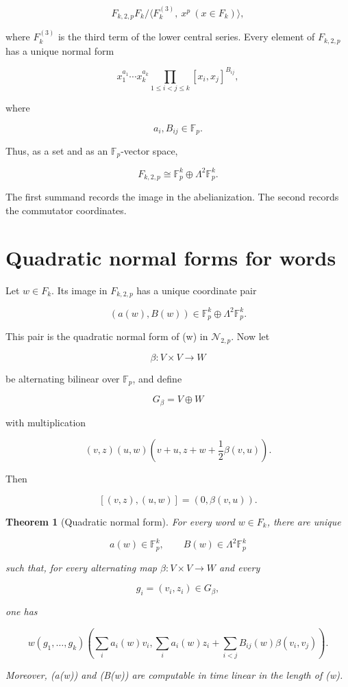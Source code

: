 \documentclass[11pt]{article}
\newtheorem{theorem}{Theorem}[section]
\begin{document}
\[
F_{k,2,p}
F_k/
\langle
F_k^{(3)},\ x^p\ (x\in F_k)
\rangle,
\]

where $F_k^{(3)}$ is the third term of the lower central series. Every element of $F_{k,2,p}$ has a unique normal form

\[
x_1^{a_1}\cdots x_k^{a_k}
\prod_{1\le i<j\le k}[x_i,x_j]^{B_{ij}},
\]

where

\[
a_i,B_{ij}\in\mathbb F_p.
\]

Thus, as a set and as an $\mathbb F_p$-vector space,

\[
F_{k,2,p}\cong \mathbb F_p^k\oplus\Lambda^2\mathbb F_p^k.
\]

The first summand records the image in the abelianization. The second records the commutator coordinates.

\section{Quadratic normal forms for words}

Let $w\in F_k$. Its image in $F_{k,2,p}$ has a unique coordinate pair

\[
(a(w),B(w))\in
\mathbb F_p^k\oplus\Lambda^2\mathbb F_p^k.
\]

This pair is the quadratic normal form of (w) in $\mathcal N_{2,p}$. Now let

\[
\beta:V\times V\to W
\]

be alternating bilinear over $\mathbb F_p$, and define

\[
G_\beta=V\oplus W
\]

with multiplication

\[
(v,z)(u,w)
\left(
v+u,
z+w+\frac12\beta(v,u)
\right).
\]

Then

\[
[(v,z),(u,w)]=(0,\beta(v,u)).
\]

\begin{theorem}[Quadratic normal form]
For every word $w\in F_k$, there are unique

\[
a(w)\in\mathbb F_p^k,
\qquad
B(w)\in\Lambda^2\mathbb F_p^k
\]

such that, for every alternating map $\beta:V\times V\to W$ and every

\[
g_i=(v_i,z_i)\in G_\beta,
\]

one has

\[
w(g_1,\dots,g_k)
\left(
\sum_i a_i(w)v_i,
\sum_i a_i(w)z_i+
\sum_{i<j}B_{ij}(w)\beta(v_i,v_j)
\right).
\]

Moreover, (a(w)) and (B(w)) are computable in time linear in the length of (w).

\end{theorem}
\end{document}

